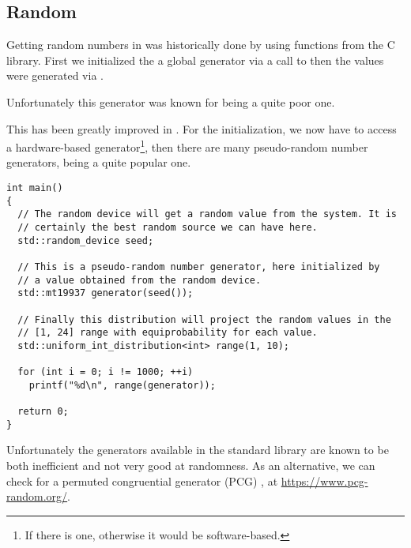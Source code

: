 \subsection{Random}

\problemtitle

Getting random numbers in \cpp{} was historically done by using
functions from the C library. First we initialized the a global
generator via a call to  then the values were generated
via .

Unfortunately this generator was known for being a quite poor one.

\solutiontitle

%
%
This has been greatly improved in . For the initialization, we
now have  to access a hardware-based
generator\footnote{If there is one, otherwise it would be
  software-based.}, then there are many pseudo-random number
generators,  being a quite popular one.

\begin{lstlisting}
int main()
{
  // The random device will get a random value from the system. It is
  // certainly the best random source we can have here.
  std::random_device seed;

  // This is a pseudo-random number generator, here initialized by
  // a value obtained from the random device.
  std::mt19937 generator(seed());

  // Finally this distribution will project the random values in the
  // [1, 24] range with equiprobability for each value.
  std::uniform_int_distribution<int> range(1, 10);

  for (int i = 0; i != 1000; ++i)
    printf("%d\n", range(generator));

  return 0;
}
\end{lstlisting}

Unfortunately the generators available in the standard library are
known to be both inefficient and not very good at randomness. As an
alternative, we can check for a permuted congruential generator (PCG)
\cite{pcg}, at \url{https://www.pcg-random.org/}.
